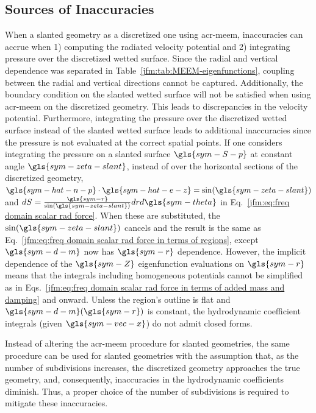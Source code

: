 \documentclass[ASNA,twocolumn]{USG} %
\begin{document}
\subsection{Sources of Inaccuracies}
When \modelling{} a slanted geometry as a discretized one using \gls{acr-meem}, inaccuracies can accrue when 1) computing the radiated velocity potential and 2) integrating pressure over the discretized wetted surface.
Since the radial and vertical dependence was separated in Table~\ref{jfm:tab:MEEM-eigenfunctions}, coupling between the radial and vertical directions cannot be captured.
Additionally, the boundary condition on the slanted wetted surface will not be satisfied when using \gls{acr-meem} on the discretized geometry.
This leads to discrepancies in the velocity potential.
Furthermore, integrating the pressure over the discretized wetted surface instead of the slanted wetted surface leads to additional inaccuracies since the pressure is not evaluated at the correct spatial points.
If one considers integrating the pressure on a slanted surface $\gls{sym-S-p}$ at constant angle $\gls{sym-zeta-slant}$, instead of over the horizontal sections of the discretized geometry, $\gls{sym-hat-n-p} \cdot \gls{sym-hat-e-z} = \sin(\gls{sym-zeta-slant})$ and $dS = \frac{\gls{sym-r}}{\sin(\gls{sym-zeta-slant})}drd\gls{sym-theta}$ in Eq.~\ref{jfm:eq:freq domain scalar rad force}.
When these are substituted, the $\sin(\gls{sym-zeta-slant})$ cancels and the result is the same as Eq.~\ref{jfm:eq:freq domain scalar rad force in terms of regions}, except $\gls{sym-d-m}$ now has $\gls{sym-r}$ dependence.
However, the implicit dependence of the $\gls{sym-Z}$ eigenfunction evaluations on $\gls{sym-r}$ means that the integrals including homogeneous potentials cannot be simplified as in Eqs.~\ref{jfm:eq:freq domain scalar rad force in terms of added mass and damping} and onward.
Unless the region's outline is flat and $\gls{sym-d-m}(\gls{sym-r})$ is constant, the hydrodynamic coefficient integrals (given $\gls{sym-vec-x}$) do not admit closed forms. 

Instead of altering the \gls{acr-meem} procedure for slanted geometries, the same procedure can be used for \modelling{} slanted geometries with the assumption that, as the number of subdivisions increases, the discretized geometry approaches the true geometry, and, consequently, inaccuracies in the hydrodynamic coefficients diminish.
Thus, a proper choice of the number of subdivisions is required to mitigate these inaccuracies.
\end{document}
